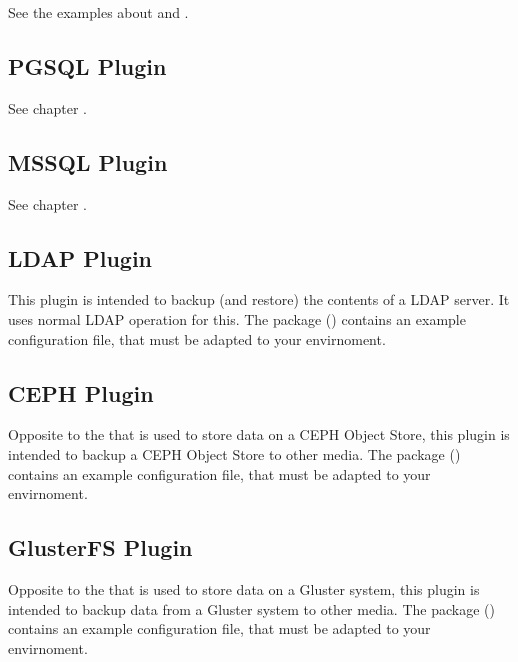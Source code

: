 See the examples about  and .


\subsection{PGSQL Plugin}

See chapter .


\subsection{MSSQL Plugin}

See chapter .

\subsection{LDAP Plugin}

This plugin is intended to backup (and restore) the contents of a LDAP server.
It uses normal LDAP operation for this.
The package  () contains an example configuration file, that must be adapted to your envirnoment.

\subsection{CEPH Plugin}

Opposite to the  that is used to store data on a CEPH Object Store,
this plugin is intended to backup a CEPH Object Store to other media.
The package  () contains an example configuration file, that must be adapted to your envirnoment.


\subsection{GlusterFS Plugin}

Opposite to the  that is used to store data on a Gluster system,
this plugin is intended to backup data from a Gluster system to other media.
The package  () contains an example configuration file, that must be adapted to your envirnoment.


